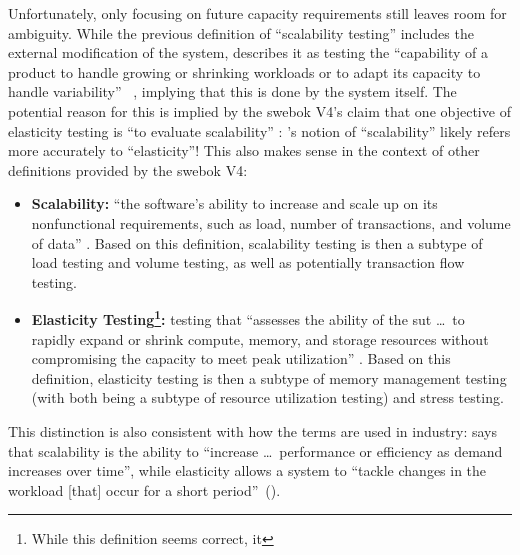 Unfortunately, only focusing on future capacity requirements still leaves room
for ambiguity. While the previous definition of ``scalability testing'' includes
the external modification of the system, \ifnotpaper \citeauthor{ISO_IEC2023a}
\else \cite{ISO_IEC2023a} \fi describes it as
testing the ``capability of a product to handle growing or shrinking
workloads or to adapt its capacity to handle variability''%
\ifnotpaper\ \citeyearpar{ISO_IEC2023a}\fi, implying that this is done by the
system itself. The potential reason for this is implied by the \acs{swebok} V4's
claim that one objective of elasticity testing is ``to evaluate scalability''
\citep[p.~5-9]{SWEBOK2024}: \ifnotpaper \citeauthor{ISO_IEC2023a}%
\else \cite{ISO_IEC2023a}\fi's notion of ``scalability''
likely refers more accurately to ``elasticity''! This also makes sense in the
context of other definitions provided by the \acs{swebok} V4:
\begin{itemize}
    \item \textbf{Scalability:} ``the software's ability to increase and
          scale up on its nonfunctional requirements, such as load, number of
          transactions, and volume of data'' \citep[p.~5-5]{SWEBOK2024}.
          Based on this
          definition, scalability testing is then a subtype of load testing
          and volume testing, as well as potentially transaction flow testing.
    \item \textbf{Elasticity Testing\footnote{While this definition seems
                  correct, it \swebokElasRef{}}:} testing that ``assesses
          the ability of the \acs{sut} \dots\ to rapidly expand or shrink
          compute, memory, and storage resources without compromising the
          capacity to meet peak utilization'' \citep[p.~5-9]{SWEBOK2024}.
          Based on this
          definition, elasticity testing is then a subtype of memory
          management testing (with both being a subtype of resource
          utilization testing) and stress testing.
\end{itemize}
This distinction is also consistent with how the terms are used in industry:
\ifnotpaper \citeauthor{Pandey2023} \else \cite{Pandey2023} \fi says
that scalability is the ability to ``increase
\dots\ performance or efficiency as demand increases over time'', while
elasticity allows a system to ``tackle changes in the workload [that] occur for
a short period''\ifnotpaper\ (\citeyear{Pandey2023})\fi.

